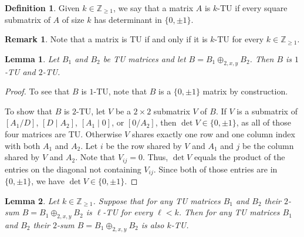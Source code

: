 \documentclass{article}
\newtheorem{lemma}{Lemma}
\theoremstyle{definition}
\newtheorem{definition}{Definition}
\newtheorem{remark}{Remark}
\begin{document}
\begin{definition}
    Given $k \in \mathbb{Z}_{\geq 1}$, we say that a matrix $A$ is $k$-TU if every square submatrix of $A$ of size $k$ has determinant in $\{0, \pm 1\}$.
\end{definition}

\begin{remark}
    Note that a matrix is TU if and only if it is $k$-TU for every $k \in \mathbb{Z}_{\geq 1}$.
\end{remark}

\begin{lemma}\label{lem:two_sum_reg_det_12}
    Let $B_{1}$ and $B_{2}$ be TU matrices and let $B = B_{1} \oplus_{2, x, y} B_{2}$. Then $B$ is $1$-TU and $2$-TU.
\end{lemma}

\begin{proof}
    To see that $B$ is $1$-TU, note that $B$ is a $\{0, \pm 1\}$ matrix by construction.

    To show that $B$ is $2$-TU, let $V$ be a $2 \times 2$ submatrix $V$ of $B$. If $V$ is a submatrix of $\left[A_{1} / D\right]$, $\left[D \mid A_{2}\right]$, $\left[A_{1} \mid 0\right]$, or $\left[0 / A_{2}\right]$, then $\det V \in \{0, \pm 1\}$, as all of those four matrices are TU. Otherwise $V$ shares exactly one row and one column index with both $A_{1}$ and $A_{2}$. Let $i$ be the row shared by $V$ and $A_{1}$ and $j$ be the column shared by $V$ and $A_{2}$. Note that $V_{ij} = 0$. Thus, $\det V$ equals the product of the entries on the diagonal not containing $V_{ij}$. Since both of those entries are in $\{0, \pm 1\}$, we have $\det V \in \{0, \pm 1\}$.
\end{proof}

\begin{lemma}\label{lem:two_sum_reg_det_induction}
    Let $k \in \mathbb{Z}_{\geq 1}$. Suppose that for any TU matrices $B_{1}$ and $B_{2}$ their $2$-sum $B = B_{1} \oplus_{2, x, y} B_{2}$ is $\ell$-TU for every $\ell < k$. Then for any TU matrices $B_{1}$ and $B_{2}$ their $2$-sum $B = B_{1} \oplus_{2, x, y} B_{2}$ is also $k$-TU.
\end{lemma}
\end{document}
